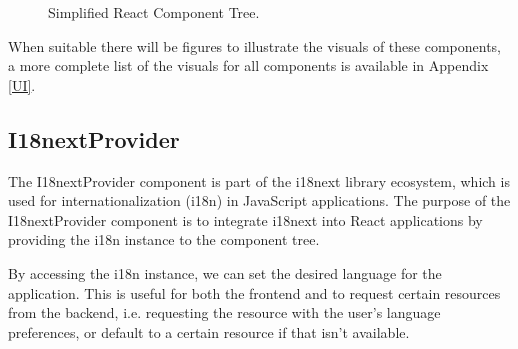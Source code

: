 \begin{figure}[h]
	\begin{center}
	\end{center}
	\caption{Simplified React Component Tree.}\label{fig:reactComponentTree}
\end{figure}

When suitable there will be figures to illustrate the visuals of these components, a more complete list of the visuals for all components is available in Appendix \ref{UI}.
\subsection{I18nextProvider}\label{I18n_component}

The I18nextProvider component is part of the i18next library ecosystem, which is used for internationalization (i18n) in JavaScript applications. The purpose of the I18nextProvider component is to integrate i18next into React applications by providing the i18n instance to the component tree.

By accessing the i18n instance, we can set the desired language for the application. This is useful for both the frontend and to request certain resources from the backend, i.e. requesting the resource with the user's language preferences, or default to a certain resource if that isn't available.


